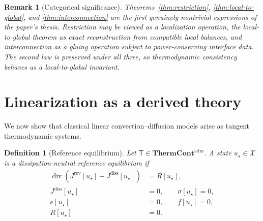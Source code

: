 \documentclass[11pt]{article}
\newtheorem{definition}[theorem]{Definition}
\newtheorem{remark}[theorem]{Remark}
\newcommand{\diver}{\operatorname{div}}
\newcommand{\X}{\mathcal{X}}
\newcommand{\ThermAdm}{\mathbf{ThermCont}^{\mathrm{adm}}}
\begin{document}
\begin{remark}[Categorical significance]
Theorems~\ref{thm:restriction}, \ref{thm:local-to-global}, and
\ref{thm:interconnection} are the first genuinely nontrivial expressions of the
paper's thesis. Restriction may be viewed as a localization operation, the
local-to-global theorem as exact reconstruction from compatible local balances, and
interconnection as a gluing operation subject to power-conserving interface data. The
second law is preserved under all three, so thermodynamic consistency behaves as a
local-to-global invariant.
\end{remark}

\section{Linearization as a derived theory}

We now show that classical linear convection--diffusion models arise as tangent
thermodynamic systems.

\begin{definition}[Reference equilibrium]
Let \(\mathsf{T}\in\ThermAdm\). A state \(u_\star\in\X\) is a
\emph{dissipation-neutral reference equilibrium} if
\begin{align}
\diver(J^{\mathrm{rev}}[u_\star]+J^{\mathrm{diss}}[u_\star])&=R[u_\star],
\label{eq:eq1}\\
J^{\mathrm{diss}}[u_\star]&=0,\qquad \sigma[u_\star]=0,\label{eq:eq2}\\
e[u_\star]&=0,\qquad f[u_\star]=0,\label{eq:eq3}\\
R[u_\star]&=0.\label{eq:eq4}
\end{align}
\end{definition}
\end{document}
